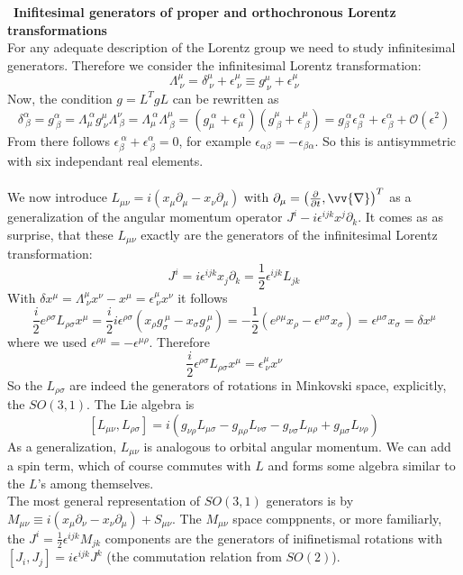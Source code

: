 \documentclass{include/thesisclass}
\newcommand{\p}{\partial}
\newcommand{\OO}{\mathcal{O}}
\newcommand{\eps}{\epsilon}
\newcommand{\vn}{\vv{\nabla}}
\newcommand{\sub}[1]{~\newline\newline\textbf{#1}\\}
\begin{document}
\sub{Inifitesimal generators of proper and orthochronous Lorentz transformations}
For any adequate description of the Lorentz group we need to study infinitesimal generators. Therefore we consider the infinitesimal Lorentz transformation:
\[ \Lambda^\mu_{~\nu} = \delta^\mu_{~\nu} + \eps^\mu_{~\nu} \equiv g^\mu_{~\nu} + \eps^\mu_{~\nu}\]
Now, the condition $g = L^T g L$ can be rewritten as 
\[ \delta^\alpha_{~\beta} = g^\alpha_{~\beta} = \Lambda_\mu^{~\alpha} g^\mu_{~\nu}\Lambda^\nu_{~\beta} = \Lambda_\mu^{~\alpha}\Lambda^\mu_{~\beta} = ( g_\mu^{~\alpha} + \eps_\mu^{~\alpha})(g^\mu_{~\beta} + \eps^\mu_{~\beta}) = g_\beta^{~\alpha} \eps_\beta^{~\alpha} + \eps^\alpha_{~\beta} + \OO(\eps^2)\]
From there follows $\eps_\beta^{~\alpha} + \eps^\alpha_{~\beta} = 0$, for example $\eps_{\alpha\beta} = - \eps_{\beta\alpha}$. So this is antisymmetric with six independant real elements.\\
\\
We now introduce $L_{\mu\nu} = i ( x_\mu \p_\mu - x_\nu\p_\mu)$ with $\p_\mu = \left( \frac{\p}{\p t}, \vn\right)^T$ as a generalization of the angular momentum operator $J^i -i \eps^{ijk} x^j \p_k$. It comes as as surprise, that these $L_{\mu\nu}$ exactly are the generators of the infinitesimal Lorentz transformation:
\[J^i = i \eps^{ijk} x_j \p _k = \frac{1}{2}\eps^{ijk} L_{jk}\]
With $\delta x^\mu = \Lambda^\mu_{~\nu} x^\nu - x^\mu = \eps^\mu_{~\nu} x^\nu$ it follows
\[ \frac{i}{2} e^{\rho\sigma} L_{\rho\sigma} x^\mu = \frac{i}{2} i \eps^{\rho\sigma} ( x_\rho g_\sigma^{~\mu}- x_\sigma g_\rho^{~\mu}) = - \frac{1}{2} (e^{\rho\mu} x_\rho - \eps^{\mu\sigma}x_\sigma )= \eps^{\mu\sigma}x_\sigma = \delta x^\mu\]
where we used $\eps^{\rho\mu} = - \eps^{\mu\rho}$. Therefore
\[ \frac{i}{2}\eps^{\rho\sigma} L_{\rho\sigma} x^\mu = \eps^\mu_{~\nu} x^\nu\]
So the $L_{\rho\sigma}$ are indeed the generators of rotations in Minkovski space, explicitly, the $SO(3,1)$. The Lie algebra is
\[ [L_{\mu\nu}, L_{\rho\sigma}] = i ( g_{\nu\rho} L_{\mu\sigma} - g_{\mu\rho}L_{\nu\sigma} - g_{\nu\sigma}L_{\mu\rho} + g_{\mu\sigma}L_{\nu\rho})\]
\newline
As a generalization, $L_{\mu\nu}$ is analogous to orbital angular momentum. We can add a spin term, which of course commutes with $L$ and forms some algebra similar to the $L$'s among themselves.\\
The most general representation of $SO(3,1)$ generators is by $M_{\mu\nu} \equiv i(x_\mu \p_\nu - x_\nu\p_\mu) + S_{\mu\nu}$. The $M_{\mu\nu}$ space comppnents, or more familiarly, the $J^i = \frac{1}{2} \eps^{ijk} M_{jk}$ components are the generators of inifinetismal rotations with $[J_i, J_j] = i \eps^{ijk} J^k$ (the commutation relation from $SO(2)$).\\
\end{document}
